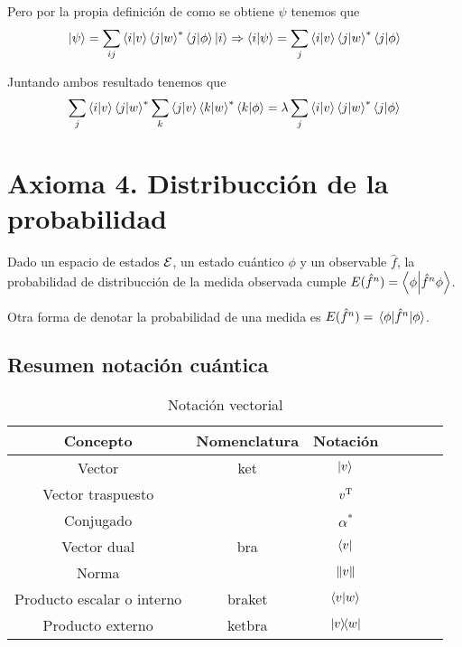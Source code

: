 Pero por la propia definición de como se obtiene $\psi$ tenemos que
\begin{equation*}
	\ket{\psi} = \sum_{ij}\braket{i}{v}\braket{j}{w}^*\braket{j}{\phi}\ket{i}\Rightarrow \braket{i}{\psi} = \sum_{j}\braket{i}{v}\braket{j}{w}^*\braket{j}{\phi}
\end{equation*}

Juntando ambos resultado tenemos que
\begin{equation*}
	\sum_{j}\braket{i}{v}\braket{j}{w}^*\sum_{k}\braket{j}{v}\braket{k}{w}^*\braket{k}{\phi} = \lambda\sum_{j}\braket{i}{v}\braket{j}{w}^*\braket{j}{\phi}

\end{equation*}

\section{Axioma 4. Distribucción de la probabilidad}\label{sec:asioma-4.-distrubicción-de-la-probabilidad}
\begin{definition}[Axioma 4]
	Dado un espacio de estados $\mathcal{E}$, un estado cuántico $\phi$ y un observable $\hat{f}$, la probabilidad de distribucción de la medida observada cumple $E(\hat{f}^n)=\braket{\phi}{\hat{f}^n\phi}$.
\end{definition}
Otra forma de denotar la probabilidad de una medida es $E(\hat{f}^n)=\ev{\hat{f}^n}{\phi}$.

\subsection{Resumen notación cuántica}\label{subsec:resumen-notacion-cuantica}
\begin{table}[htbp]
	\caption{Notación vectorial\label{tab:notacion-vectorial}}
	\centering
	\begin{tabular}{ccccccc}
		\toprule
		Concepto                 & Nomenclatura & Notación        \\
		\midrule
		Vector                     & ket          & $\ket{v}$       \\
		Vector traspuesto          &              & $v^\text{T}$ \\
		Conjugado                  &              & $\alpha^*$      \\
		Vector dual                & bra          & $\bra{v}$       \\
		Norma                      &              & $\norm{v}$      \\
		Producto escalar o interno & braket       & $\braket{v}{w}$ \\
		Producto externo           & ketbra       & $\ketbra{v}{w}$ \\
		\bottomrule
	\end{tabular}
\end{table}

